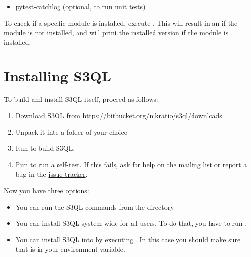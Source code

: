 \documentclass[letterpaper,10pt,english]{sphinxmanual}
\begin{document}
\begin{itemize}
\begin{itemize}
\item {} 
\href{https://github.com/eisensheng/pytest-catchlog}{pytest-catchlog}
(optional, to run unit tests)

\end{itemize}

To check if a specific module  is installed, execute
. This will result in an
 if the module is not installed, and will print the
installed version if the module is installed.

\end{itemize}


\section{Installing S3QL}
\label{installation:inst-s3ql}\label{installation:installing-s3ql}
To build and install S3QL itself, proceed as follows:
\begin{enumerate}
\item {} 
Download S3QL from \href{https://bitbucket.org/nikratio/s3ql/downloads}{https://bitbucket.org/nikratio/s3ql/downloads}

\item {} 
Unpack it into a folder of your choice

\item {} 
Run  to build S3QL.

\item {} 
Run  to run a self-test. If this fails, ask
for help on the \href{http://groups.google.com/group/s3ql}{mailing list} or report a bug in the
\href{https://bitbucket.org/nikratio/s3ql/issues}{issue tracker}.

\end{enumerate}

Now you have three options:
\begin{itemize}
\item {} 
You can run the S3QL commands from the  directory.

\item {} 
You can install S3QL system-wide for all users. To do that, you
have to run .

\item {} 
You can install S3QL into  by executing . In this case you should make sure that
 is in your  environment variable.

\end{itemize}
\end{document}
